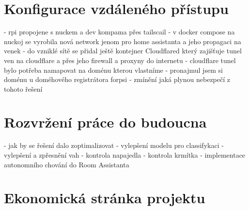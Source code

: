 \section{Konfigurace vzdáleného přístupu}\label{sec:konfigurace-vzdaleneho-pristupu}
- rpi propojene s nuckem a dev kompama přes tailscail\newline
- v docker compose na nuckoj se vyrobila nová network jenom pro home assistanta a jeho propagaci na venek\newline
- do vzniklé sítě se přidal ještě kontejner Cloudflared který zajišťuje tunel ven na cloudflare a přes jeho firewall a proxyny do internetu\newline
- cloudflare tunel bylo potřeba namapovat na doménu kterou vlastníme\newline
- pronajmul jsem si doménu u doméhového registrátora forpsi\newline
- zmínění jaká plynou nebezpečí z tohoto řešení


\section{Rozvržení práce do budoucna}\label{sec:rozvrzeni-prace-do-budoucna}
- jak by se řešení dalo zoptimalizovat\newline
- vylepšení modelu pro classifykaci\newline
- vylepšení a zpřesnění vah\newline
- kontrola napajedla\newline
- kontrola krmítka
- implementace autonomního chování do Room Assistanta


\section{Ekonomická stránka projektu}\label{sec:ekonomicka-stranka-projektu}

